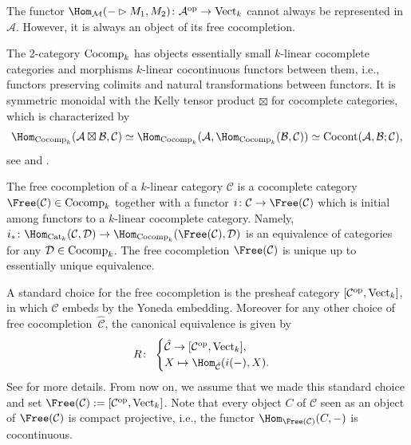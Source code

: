 The functor $\Hom_\mathcal{M}(-\rhd M_1, M_2)\colon\mathcal{A}^{\rm op} \to {\rm Vect}_k$ cannot always be represented in $\mathcal{A}$. However, it is always an object of its free cocompletion.
\begin{Definition}
The 2-category ${\rm Cocomp}_k$ has objects essentially small $k$-linear cocomplete categories and morphisms $k$-linear cocontinuous functors between them, i.e., functors preserving colimits and natural transformations between functors.
It is symmetric monoidal with the Kelly tensor product $\boxtimes$ for cocomplete categories, which is characterized by
\[
\Hom_{{\rm Cocomp}_k}(\mathcal{A} \boxtimes \mathcal{B},\mathcal{C}) \simeq \Hom_{{\rm Cocomp}_k}(\mathcal{A},\Hom_{{\rm Cocomp}_k}(\mathcal{B},\mathcal{C})) \simeq {\rm Cocont}(\mathcal{A},\mathcal{B};\mathcal{C}),
\]
see \cite[Section~6.5]{Kelly2} and \cite[Theorem~2.45]{Ramos}.

The free cocompletion of a $k$-linear category $\mathcal{C}$ is a cocomplete category $\Free(\mathcal{C}) \in {\rm Cocomp}_k$ together with a functor $i\colon \mathcal{C} \to \Free(\mathcal{C})$ which is initial among functors to a $k$-linear cocomplete category. Namely, $i_*\colon \Hom_{{\rm Cat}_k}(\mathcal{C},\mathcal{D}) \to \Hom_{{\rm Cocomp}_k}(\Free(\mathcal{C}),\mathcal{D})$ is an equivalence of categories for any $\mathcal{D}\in {\rm Cocomp}_k$. The free cocompletion $\Free(\mathcal{C})$ is unique up to essentially unique equivalence.
\end{Definition}

\begin{Remark}\label{rmkFreeIsPresheaves}
A standard choice for the free cocompletion is the presheaf category $[\mathcal{C}^{\rm op},{\rm Vect}_k]$, in which $\mathcal{C}$ embeds by the Yoneda embedding. Moreover for any other choice of free cocompletion~$\hat{\mathcal{C}}$, the canonical equivalence is given by
\[
R\colon\ \begin{cases}
\hat{\mathcal{C}}  \to  [\mathcal{C}^{\rm op},{\rm Vect}_k],
\\
X \mapsto  \Hom_{\hat{\mathcal{C}}}(i(-),X).\end{cases}
\]
See \cite[Section~2.2]{Dugger} for more details. From now on, we assume that we made this standard choice and set $\Free(\mathcal{C}) := [\mathcal{C}^{\rm op},{\rm Vect}_k]$.
Note that every object $C$ of $\mathcal{C}$ seen as an object of $\Free(\mathcal{C})$ is compact projective, i.e., the functor $\Hom_{\Free(\mathcal{C})}(C,-)$ is cocontinuous.
\end{Remark}

